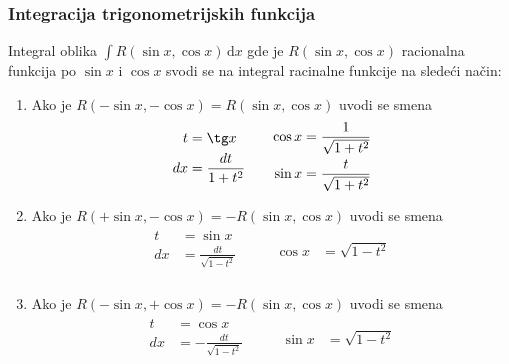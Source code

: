 \subsubsection{Integracija trigonometrijskih funkcija}
	Integral oblika $\int R (\sin x, \cos x)\, \mathrm{d}x$ gde je $R(\sin x, \cos x)$ racionalna funkcija po $\sin x$ i $\cos x$ svodi se na integral racinalne funkcije na sledeći način:
	\begin{enumerate}[label=\textbf{\arabic*.)}]
		\item 
			Ako je $R (-\sin x, -\cos x) = R (\sin x, \cos x)$ uvodi se smena 
			\begin{align*}
				\begin{aligned}
					t &= \tg x\\
					dx &= \frac{dt}{1+t^2}\\
				\end{aligned}
				\quad \quad
				\begin{aligned}
					\cos x &= \frac{1}{\sqrt{1+t^2}}\\
					\sin x &= \frac{t}{\sqrt{1+t^2}}
				\end{aligned}
			\end{align*}
		\item 
			Ako je $R (+\sin x, -\cos x) = -R (\sin x, \cos x)$ uvodi se smena 
			\begin{align*}
				\begin{aligned}
					t &= \sin x\\
					dx &= \frac{dt}{\sqrt{1-t^2}}\\
				\end{aligned}
				\quad \quad
				\begin{aligned}
					\cos x &= \sqrt{1-t^2}\\
				\end{aligned}
			\end{align*}
		\item 
			Ako je $R (-\sin x, +\cos x) = -R (\sin x, \cos x)$ uvodi se smena 
			\begin{align*}
				\begin{aligned}
					t &= \cos x\\
					dx &= -\frac{dt}{\sqrt{1-t^2}}\\
				\end{aligned}
				\quad \quad
				\begin{aligned}
					\sin x &= \sqrt{1-t^2}\\
				\end{aligned}
			\end{align*}

\end{enumerate}
